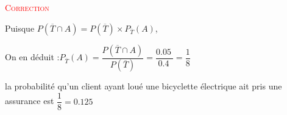 \documentclass[10pt]{article}
\providecommand{\np}[2][]{{#2~#1}}
\begin{document}
\begin{enumerate}
			 \textcolor{red}{\textsc{Correction}}


		Puisque \quad \mbox{$P(\overline{T}\cap A)=P(\overline{T})\times P_{\overline{T}}(A)$},

		On en déduit :\quad \mbox{$P_{\overline{T}}(A)=\dfrac{P(\overline{T} \cap A)}{P(\overline{T})} = \dfrac{\np{0.05}}{\np{0.4}}=\dfrac18$}

		la probabilité qu'un client ayant loué une bicyclette électrique ait pris une assurance est \mbox{$\dfrac18=\np{0.125}$}

\end{enumerate}
\end{document}
